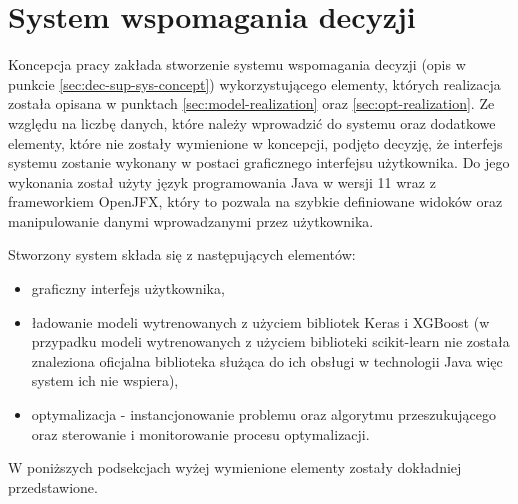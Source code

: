 \section{System wspomagania decyzji}\label{sec:system}
Koncepcja pracy zakłada stworzenie systemu wspomagania decyzji (opis w punkcie \ref{sec:dec-sup-sys-concept}) wykorzystującego elementy, których realizacja została opisana w punktach \ref{sec:model-realization} oraz \ref{sec:opt-realization}. Ze względu na liczbę danych, które należy wprowadzić do systemu oraz dodatkowe elementy, które nie zostały wymienione w koncepcji, podjęto decyzję, że interfejs systemu zostanie wykonany w postaci graficznego interfejsu użytkownika. Do jego wykonania został użyty język programowania Java w wersji 11 wraz z frameworkiem OpenJFX, który to pozwala na szybkie definiowane widoków oraz manipulowanie danymi wprowadzanymi przez użytkownika.

Stworzony system składa się z następujących elementów:
\begin{itemize}
    \item graficzny interfejs użytkownika,
    \item ładowanie modeli wytrenowanych z użyciem bibliotek Keras i XGBoost (w przypadku modeli wytrenowanych z użyciem biblioteki scikit-learn nie została znaleziona oficjalna biblioteka służąca do ich obsługi w technologii Java więc system ich nie wspiera),
    \item optymalizacja - instancjonowanie problemu oraz algorytmu przeszukującego oraz sterowanie i monitorowanie procesu optymalizacji.
\end{itemize}

W poniższych podsekcjach wyżej wymienione elementy zostały dokładniej przedstawione.

